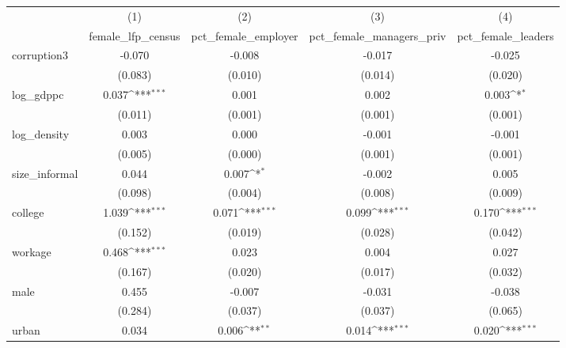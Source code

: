{
\def\sym#1{\ifmmode^{#1}\else\(^{#1}\)\fi}
\begin{tabular}{l*{4}{c}}
\hline\hline
            &\multicolumn{1}{c}{(1)}&\multicolumn{1}{c}{(2)}&\multicolumn{1}{c}{(3)}&\multicolumn{1}{c}{(4)}\\
            &\multicolumn{1}{c}{female\_lfp\_census}&\multicolumn{1}{c}{pct\_female\_employer}&\multicolumn{1}{c}{pct\_female\_managers\_priv}&\multicolumn{1}{c}{pct\_female\_leaders}\\
\hline
corruption3 &      -0.070         &      -0.008         &      -0.017         &      -0.025         \\
            &     (0.083)         &     (0.010)         &     (0.014)         &     (0.020)         \\
[1em]
log\_gdppc   &       0.037\sym{***}&       0.001         &       0.002         &       0.003\sym{*}  \\
            &     (0.011)         &     (0.001)         &     (0.001)         &     (0.001)         \\
[1em]
log\_density &       0.003         &       0.000         &      -0.001         &      -0.001         \\
            &     (0.005)         &     (0.000)         &     (0.001)         &     (0.001)         \\
[1em]
size\_informal&       0.044         &       0.007\sym{*}  &      -0.002         &       0.005         \\
            &     (0.098)         &     (0.004)         &     (0.008)         &     (0.009)         \\
[1em]
college     &       1.039\sym{***}&       0.071\sym{***}&       0.099\sym{***}&       0.170\sym{***}\\
            &     (0.152)         &     (0.019)         &     (0.028)         &     (0.042)         \\
[1em]
workage     &       0.468\sym{***}&       0.023         &       0.004         &       0.027         \\
            &     (0.167)         &     (0.020)         &     (0.017)         &     (0.032)         \\
[1em]
male        &       0.455         &      -0.007         &      -0.031         &      -0.038         \\
            &     (0.284)         &     (0.037)         &     (0.037)         &     (0.065)         \\
[1em]
urban       &       0.034         &       0.006\sym{**} &       0.014\sym{***}&       0.020\sym{***}\\

\end{tabular}}
